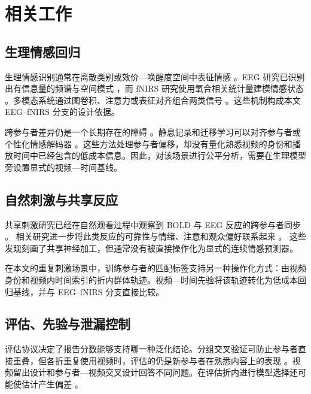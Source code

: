 \section{相关工作}
\label{sec:related}

\subsection{生理情感回归}

生理情感识别通常在离散类别或效价—唤醒度空间中表征情感
\cite{russell1980circumplex,koelstra2012deap}。EEG 研究已识别出有信息量的频谱与空间模式
\cite{zheng2015critical}，而 fNIRS 研究使用氧合相关统计量建模情感状态
\cite{bandara2018fnirs}。多模态系统通过图卷积、注意力或表征对齐组合两类信号
\cite{sun2020multimodal,chen2024eegfnirs,fang2026asac}。这些机制构成本文 EEG--fNIRS 分支的设计依据。

跨参与者差异仍是一个长期存在的障碍
\cite{li2022eegreview,li2018crosssubject}。静息记录和迁移学习可以对齐参与者或个性化情感解码器
\cite{morioka2015resting,zheng2016personalizing}。这些方法处理参与者偏移，却没有量化熟悉视频的身份和播放时间中已经包含的低成本信息。因此，对该场景进行公平分析，需要在生理模型旁设置显式的视频—时间基线。

\subsection{自然刺激与共享反应}

共享刺激研究已经在自然观看过程中观察到 BOLD 与 EEG 反应的跨参与者同步
\cite{hasson2004intersubject,kauppi2010isc,dmochowski2012correlated}。
相关研究进一步将此类反应的可靠性与情绪、注意和观众偏好联系起来
\cite{nummenmaa2012synchrony,ki2016attention,dmochowski2014audience}。
这些发现刻画了共享神经加工，但通常没有被直接操作化为显式的连续情感预测器。

在本文的重复刺激场景中，训练参与者的匹配标签支持另一种操作化方式：由视频身份和视频内时间索引的折内群体轨迹。视频—时间先验将该轨迹转化为低成本回归基线，并与 EEG--fNIRS 分支直接比较。

\subsection{评估、先验与泄漏控制}

评估协议决定了报告分数能够支持哪一种泛化结论。分组交叉验证可防止参与者直接重叠，但各折重复使用视频时，评估的仍是新参与者在熟悉内容上的表现
\cite{saeb2017usecase,roberts2017crossvalidation}。视频留出设计和参与者—视频交叉设计回答不同问题。在评估折内进行模型选择还可能使估计产生偏差
\cite{varma2006bias,varoquaux2017decoders}。

